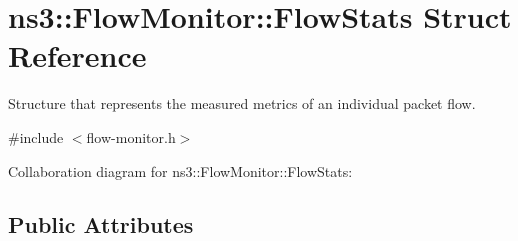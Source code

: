 \hypertarget{structns3_1_1FlowMonitor_1_1FlowStats}{}\section{ns3\+:\+:Flow\+Monitor\+:\+:Flow\+Stats Struct Reference}
\label{structns3_1_1FlowMonitor_1_1FlowStats}


Structure that represents the measured metrics of an individual packet flow.  




{\ttfamily \#include $<$flow-\/monitor.\+h$>$}



Collaboration diagram for ns3\+:\+:Flow\+Monitor\+:\+:Flow\+Stats\+:
\subsection*{Public Attributes}
